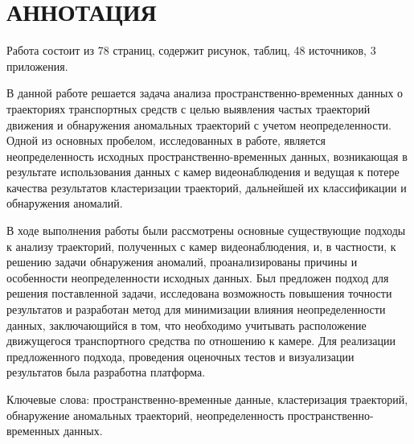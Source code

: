 \chapter*{АННОТАЦИЯ}

Работа состоит из 78 страниц, содержит  рисунок,  таблиц, 48 источников, 3 приложения.

В данной работе решается задача анализа пространственно-временных данных о траекториях транспортных средств с целью выявления частых траекторий движения и обнаружения аномальных траекторий с учетом неопределенности. Одной из основных пробелом, исследованных в работе, является неопределенность исходных пространственно-временных данных, возникающая в результате использования данных с камер видеонаблюдения и ведущая к потере качества результатов кластеризации траекторий, дальнейшей их классификации и обнаружения аномалий. 

В ходе выполнения работы были рассмотрены основные существующие подходы к анализу траекторий, полученных с камер видеонаблюдения, и, в частности, к решению задачи обнаружения аномалий, проанализированы причины и особенности неопределенности исходных данных. Был предложен подход для решения поставленной задачи, исследована возможность повышения точности результатов и разработан метод для минимизации влияния неопределенности данных, заключающийся в том, что необходимо учитывать расположение движущегося транспортного средства по отношению к камере. Для реализации предложенного подхода, проведения оценочных тестов и визуализации результатов была разработна платформа.

Ключевые слова: пространственно-временные данные, кластеризация траекторий, обнаружение аномальных траекторий, неопределенность пространственно-временных данных.